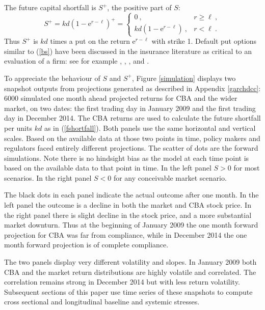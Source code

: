 \documentclass[authoryear]{elsarticle}
\newcommand{\e}{\mathrm{e}}
\newcommand{\eref}[1]{(\ref{#1})}
\newcommand{\fref}[1]{Figure \ref{#1}}
\newcommand{\aref}[1]{Appendix \ref{#1}}
\newcommand{\be}[1]{\begin{equation}\label{#1}}
\newcommand{\ee}{\end{equation}}
\begin{document}
The  future capital shortfall is $S^+$, the positive part of $S$:
\be{bs}
S^+ = kd (1-\e^{r-\ell})^+=\left\{\begin{array}{lr} 0\ , & r\ge \ell\ ,\\ kd (1-\e^{r-\ell})\ , & r<\ell\ .\end{array}\right.
\ee
Thus $S^+$ is $kd$ times a put on the return $\e^{r-\ell}$ with strike 1.  Default put options similar to \eref{bs} have been discussed in the insurance literature as critical to an evaluation of a firm:  see for
example \citet{merton1977analytic}, \citet{doherty1986price}, \citet{cummins1988risk}, \citet{myers2001capital} and \citet{sherris2006solvency}.

To appreciate the behaviour of $S$ and $S^+$, \fref{simulation}   displays two snapshot outputs from projections generated as described  in \aref{garchdcc}:  6000  simulated one month ahead projected returns for  CBA and the wider market, on  two dates: the first trading day in January 2009 and the first trading day in December 2014.  The CBA returns are used to calculate the future shortfall per units $kd$ as in \eref{fshortfall}.  Both panels use the same horizontal and vertical scales.   Based on the available data at those two points in  time, policy makers and regulators faced entirely different projections.   The scatter of dots are the forward simulations.  Note there is no hindsight bias as the model at each time point is based on the available data to that point in time.     In the left panel $S>0$ for most scenarios.    In the right panel $S<0$ for any conceivable market scenario.

 The black dots in each panel indicate the actual outcome after one month.    In the left panel the outcome is a decline in both  the market and CBA stock price.    In the right panel there is slight decline in the stock price, and a more substantial market downturn.    Thus at the beginning of January  2009 the one month forward projection for  CBA was far from compliance, while in December 2014 the one month forward projection is of complete compliance.

The two panels  display very different volatility and slopes. In January 2009 both CBA and the market return distributions are highly volatile and correlated. The correlation remains strong in December 2014 but with less return volatility.  Subsequent sections of this paper use time series of these  snapshots  to compute cross sectional and longitudinal baseline and systemic stresses.
\end{document}
